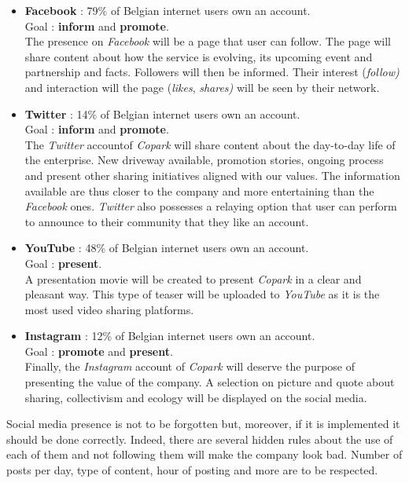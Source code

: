 \documentclass[12pt,a4paper,oneside]{book}
\newcommand{\bp}{\textit{Copark }}
\begin{document}
\begin{itemize}
\item \textbf{Facebook} : 79\% of Belgian internet users own an account.\\Goal : \textbf{inform} and \textbf{promote}.\\
The presence on \textit{Facebook} will be a page that user can follow. The page will share content about how the service is evolving, its upcoming event and partnership and facts. Followers will then be informed. Their interest (\textit{follow)} and interaction will the page (\textit{likes}, \textit{shares)} will be seen by their network. 
\item \textbf{Twitter} : 14\% of Belgian internet users own an account.\\Goal : \textbf{inform} and \textbf{promote}.\\
The \textit{Twitter} accountof \bp will share content about the day-to-day life of the enterprise. New driveway available, promotion stories, ongoing process and present other sharing initiatives aligned with our values. The information available are thus closer to the company and more entertaining than the \textit{Facebook} ones. \textit{Twitter} also possesses a relaying option that user can perform to announce to their community that they like an account.
\item \textbf{YouTube} : 48\% of Belgian internet users own an account.\\Goal : \textbf{present}.\\
A presentation movie will be created to present \bp in a clear and pleasant way. This type of teaser will be uploaded to \textit{YouTube} as it is the most used video sharing platforms.
\item \textbf{Instagram} : 12\% of Belgian internet users own an account.\\Goal : \textbf{promote} and \textbf{present}.\\
Finally, the \textit{Instagram} account of \bp will deserve the purpose of presenting the value of the company. A selection on picture and quote about sharing, collectivism and ecology will be displayed on the social media.
\end{itemize}

Social media presence is not to be forgotten but, moreover, if it is implemented it should be done correctly. Indeed, there are several hidden rules about the use of each of them and not following them will make the company look bad. Number of posts per day, type of content, hour of posting and more are to be respected.\cite{smrules}
\end{document}
